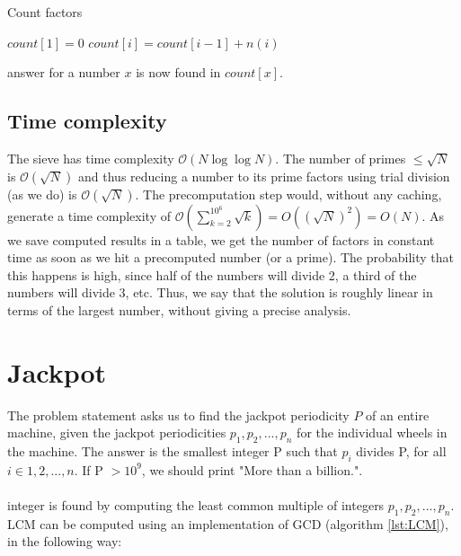 \documentclass[11pt,a4paper,twoside]{article}
\begin{document}

\begin{algorithm}
    \caption{Count factors}
    \label{factorcount}
    \begin{algorithmic}
        \STATE $count[1] = 0$
            \STATE $count[i] = count[i-1] + n(i)$
        \ENDFOR
    \end{algorithmic}
\end{algorithm}

 answer for a number $x$ is now found in $count[x]$. 
\subsection{Time complexity}
The sieve has time complexity $\mathcal{O}(N\log{\log{N}})$. The number of
primes $\le \sqrt{N}$ is $\mathcal{O}(\sqrt{N})$ and thus reducing a number to
its prime factors using trial division (as we do) is $\mathcal{O}(\sqrt{N})$.
The precomputation step would, without any caching, generate a time complexity of
$\mathcal{O}(\sum_{k=2}^{10^{6}}\sqrt{k}) = O((\sqrt{N})^2) = O(N)$. As we save computed results in a
table, we get the number of factors in constant time as soon as we hit a precomputed number (or a prime). The probability that this happens is high, since half of the numbers will divide 2, a third of the numbers will divide 3, etc. Thus, we say that the solution is roughly linear in terms of the largest number, without giving a precise analysis.

\section{Jackpot}

The problem statement asks us to find the jackpot periodicity $P$ of an entire
machine, given the jackpot periodicities $p_{1},p_{2},...,p_{n}$ for the
individual wheels in the machine. The answer is the smallest integer P such
that $p_{i}$ divides P, for all $i \in {1,2,...,n}$. If P $> 10^{9}$, we should
print "More than a billion.".
\\\\
 integer is found by computing the least common multiple of
integers $p_{1},p_{2},...,p_{n}$. LCM can be computed using an implementation
of GCD (algorithm \ref{lst:LCM}), in the following way:
\end{document}
